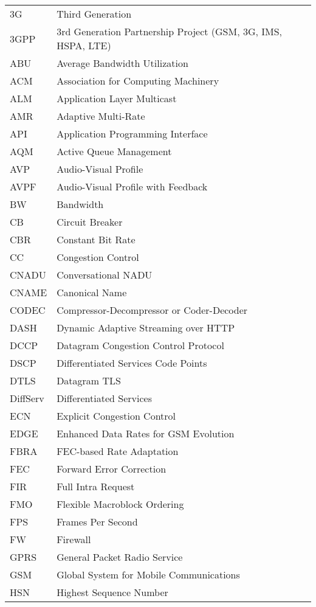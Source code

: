\begin{longtable}{ll}
3G  	& Third Generation \\
3GPP 	& 3rd Generation Partnership Project (GSM, 3G, IMS, HSPA, LTE)\\
ABU 	& Average Bandwidth Utilization \\
ACM 	& Association for Computing Machinery \\
ALM 	& Application Layer Multicast \\
AMR 	& Adaptive Multi-Rate \\
API 	& Application Programming Interface \\
AQM 	& Active Queue Management \\
AVP 	& Audio-Visual Profile \\
AVPF	& Audio-Visual Profile with Feedback \\
BW  	& Bandwidth \\
CB  	& Circuit Breaker \\
CBR 	& Constant Bit Rate \\
CC  	& Congestion Control \\
CNADU	& Conversational NADU \\
CNAME	& Canonical Name \\
CODEC	& Compressor-Decompressor or Coder-Decoder \\
DASH 	& Dynamic Adaptive Streaming over HTTP \\
DCCP 	& Datagram Congestion Control Protocol \\
DSCP 	& Differentiated Services Code Points \\
DTLS 	& Datagram TLS \\
DiffServ	& Differentiated Services \\
ECN  	& Explicit Congestion Control \\
EDGE 	& Enhanced Data Rates for GSM Evolution \\
FBRA 	& FEC-based Rate Adaptation \\
FEC  	& Forward Error Correction \\
FIR 	& Full Intra Request \\
FMO 	& Flexible Macroblock Ordering \\
FPS 	& Frames Per Second \\
FW  	& Firewall \\
GPRS 	& General Packet Radio Service \\
GSM 	& Global System for Mobile Communications \\
HSN 	& Highest Sequence Number \\

\end{longtable}
